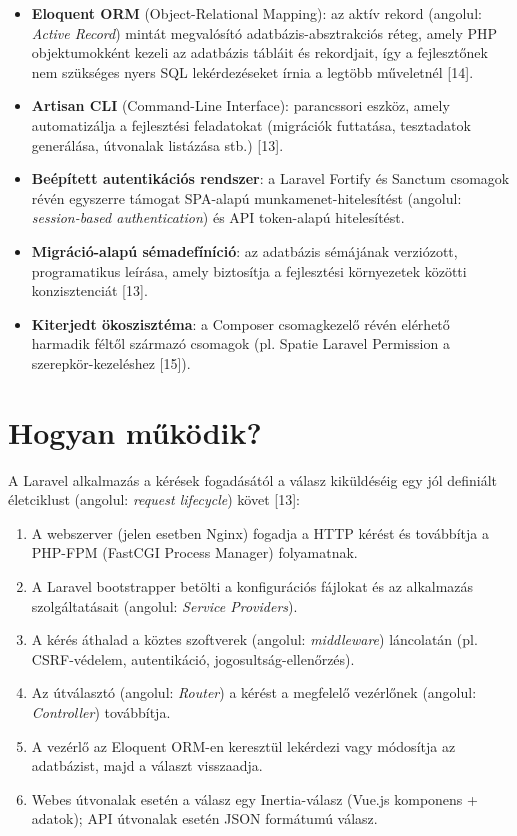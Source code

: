 \begin{itemize}
\item
  \textbf{Eloquent ORM} (Object-Relational Mapping): az aktív rekord (angolul: \emph{Active Record}) mintát megvalósító adatbázis-absztrakciós réteg, amely PHP objektumokként kezeli az adatbázis tábláit és rekordjait, így a fejlesztőnek nem szükséges nyers SQL lekérdezéseket írnia a legtöbb műveletnél {[}14{]}.
\item
  \textbf{Artisan CLI} (Command-Line Interface): parancssori eszköz, amely automatizálja a fejlesztési feladatokat (migrációk futtatása, tesztadatok generálása, útvonalak listázása stb.) {[}13{]}.
\item
  \textbf{Beépített autentikációs rendszer}: a Laravel Fortify és Sanctum csomagok révén egyszerre támogat SPA-alapú munkamenet-hitelesítést (angolul: \emph{session-based authentication}) és API token-alapú hitelesítést.
\item
  \textbf{Migráció-alapú sémadefíníció}: az adatbázis sémájának verziózott, programatikus leírása, amely biztosítja a fejlesztési környezetek közötti konzisztenciát {[}13{]}.
\item
  \textbf{Kiterjedt ökoszisztéma}: a Composer csomagkezelő révén elérhető harmadik féltől származó csomagok (pl. Spatie Laravel Permission a szerepkör-kezeléshez {[}15{]}).
\end{itemize}

\section{Hogyan működik?}\label{hogyan-mux171kuxf6dik-2}

A Laravel alkalmazás a kérések fogadásától a válasz kiküldéséig egy jól definiált életciklust (angolul: \emph{request lifecycle}) követ {[}13{]}:

\begin{enumerate}
\def\labelenumi{\arabic{enumi}.}
\item
  A webszerver (jelen esetben Nginx) fogadja a HTTP kérést és továbbítja a PHP-FPM (FastCGI Process Manager) folyamatnak.
\item
  A Laravel bootstrapper betölti a konfigurációs fájlokat és az alkalmazás szolgáltatásait (angolul: \emph{Service Providers}).
\item
  A kérés áthalad a köztes szoftverek (angolul: \emph{middleware}) láncolatán (pl. CSRF-védelem, autentikáció, jogosultság-ellenőrzés).
\item
  Az útválasztó (angolul: \emph{Router}) a kérést a megfelelő vezérlőnek (angolul: \emph{Controller}) továbbítja.
\item
  A vezérlő az Eloquent ORM-en keresztül lekérdezi vagy módosítja az adatbázist, majd a választ visszaadja.
\item
  Webes útvonalak esetén a válasz egy Inertia-válasz (Vue.js komponens + adatok); API útvonalak esetén JSON formátumú válasz.
\end{enumerate}

